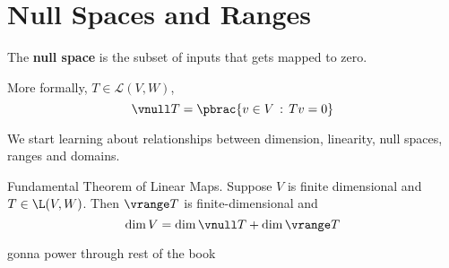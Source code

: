 \section{Null Spaces and Ranges}

\begin{definition}
  The \textbf{null space} is the subset of inputs that gets mapped to zero.

  More formally, $T \in \mathcal{L}(V, W)$,
  \begin{equation}
    \vnull T = \pbrac{
      v \in V \,:\, Tv = 0
    }
  \end{equation}
\end{definition}

We start learning about relationships between dimension, linearity, null spaces, ranges and domains.

\begin{theorem}
  Fundamental Theorem of Linear Maps.
  Suppose $V$ is finite dimensional and $T \in \L(V, W)$. Then $\vrange T$ is finite-dimensional and
  \begin{equation}
    \dim V = \dim\vnull T + \dim\vrange T
  \end{equation}
\end{theorem}







gonna power through rest of the book